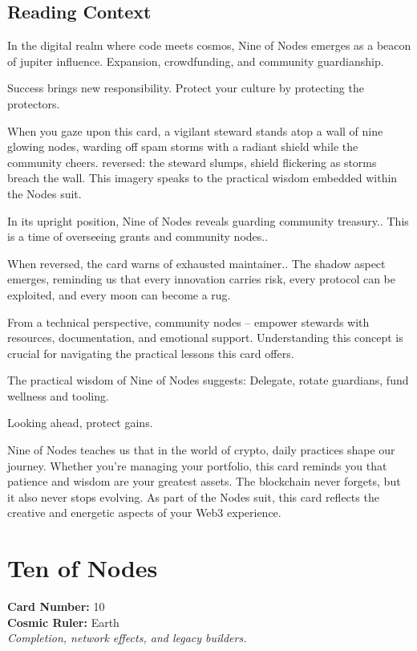 \documentclass[11pt,oneside]{book}
\begin{document}
\begin{minipage}[t]{0.55\textwidth}
  \subsection*{Reading Context}
  In the digital realm where code meets cosmos, Nine of Nodes emerges as a beacon of jupiter influence. Expansion, crowdfunding, and community guardianship.

  Success brings new responsibility. Protect your culture by protecting the protectors.

  When you gaze upon this card, a vigilant steward stands atop a wall of nine glowing nodes, warding off spam storms with a radiant shield while the community cheers. reversed: the steward slumps, shield flickering as storms breach the wall. This imagery speaks to the practical wisdom embedded within the Nodes suit.

  In its upright position, Nine of Nodes reveals guarding community treasury.. This is a time of overseeing grants and community nodes..

  When reversed, the card warns of exhausted maintainer.. The shadow aspect emerges, reminding us that every innovation carries risk, every protocol can be exploited, and every moon can become a rug.

  From a technical perspective, community nodes – empower stewards with resources, documentation, and emotional support. Understanding this concept is crucial for navigating the practical lessons this card offers.

  The practical wisdom of Nine of Nodes suggests: Delegate, rotate guardians, fund wellness and tooling.

  Looking ahead, protect gains.

  Nine of Nodes teaches us that in the world of crypto, daily practices shape our journey. Whether you're managing your portfolio, this card reminds you that patience and wisdom are your greatest assets. The blockchain never forgets, but it also never stops evolving. As part of the Nodes suit, this card reflects the creative and energetic aspects of your Web3 experience.

\end{minipage}

\newpage
\section*{Ten of Nodes}

\begin{minipage}[t]{0.55\textwidth}
  \vspace{0pt}
  \textbf{Card Number:} 10\\  \textbf{Cosmic Ruler:} Earth\\  \textit{Completion, network effects, and legacy builders.}
\end{minipage}
\end{document}
